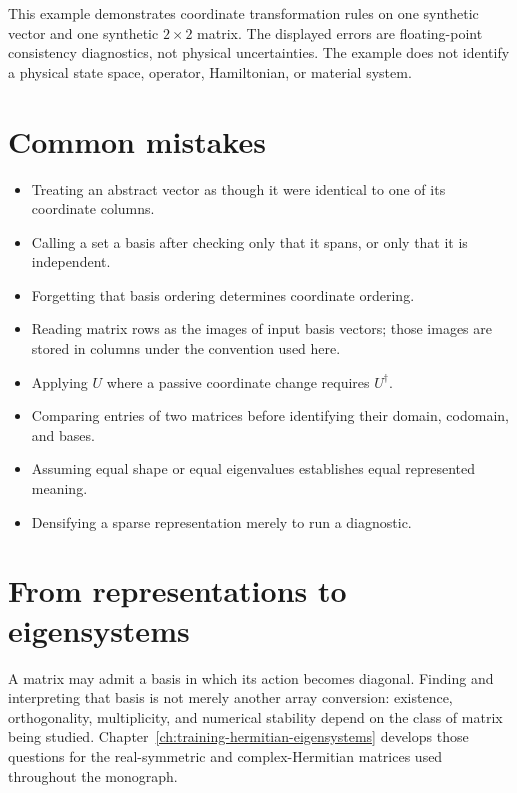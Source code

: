 This example demonstrates coordinate transformation rules on one synthetic
vector and one synthetic \(2\times2\) matrix. The displayed errors are
floating-point consistency diagnostics, not physical uncertainties. The
example does not identify a physical state space, operator, Hamiltonian, or
material system.


\section{Common mistakes}

\begin{itemize}
  \item Treating an abstract vector as though it were identical to one of its
        coordinate columns.
  \item Calling a set a basis after checking only that it spans, or only that
        it is independent.
  \item Forgetting that basis ordering determines coordinate ordering.
  \item Reading matrix rows as the images of input basis vectors; those images
        are stored in columns under the convention used here.
  \item Applying \(U\) where a passive coordinate change requires
        \(U^{\dagger}\).
  \item Comparing entries of two matrices before identifying their domain,
        codomain, and bases.
  \item Assuming equal shape or equal eigenvalues establishes equal represented
        meaning.
  \item Densifying a sparse representation merely to run a diagnostic.
\end{itemize}

\section{From representations to eigensystems}

A matrix may admit a basis in which its action becomes diagonal. Finding and
interpreting that basis is not merely another array conversion: existence,
orthogonality, multiplicity, and numerical stability depend on the class of
matrix being studied. Chapter~\ref{ch:training-hermitian-eigensystems} develops
those questions for the real-symmetric and complex-Hermitian matrices used
throughout the monograph.

